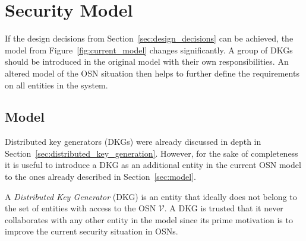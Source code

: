 \section{Security Model}
If the design decisions from Section~\ref{sec:design_decisions} can be achieved, the model from Figure~\ref{fig:current_model} changes significantly. A group of DKGs should be introduced in the original model with their own responsibilities. An altered model of the OSN situation then helps to further define the requirements on all entities in the system.

\subsection{Model}
Distributed key generators (DKGs) were already discussed in depth in Section~\ref{sec:distributed_key_generation}. However, for the sake of completeness it is useful to introduce a DKG as an additional entity in the current OSN model to the ones already described in Section~\ref{sec:model}.

\begin{defn}[DKG]
\label{def:dkg}
 A \textit{Distributed Key Generator} (DKG) is an entity that ideally does not belong to the set of entities with access to the OSN $\mathcal{V}$. A DKG is trusted that it never collaborates with any other entity in the model since its prime motivation is to improve the current security situation in OSNs.
\end{defn}

